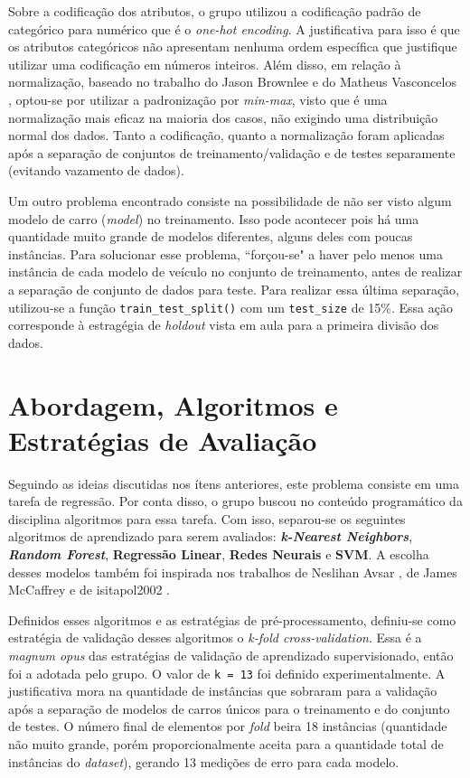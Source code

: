 \documentclass{report}
\let\oldsection\section
\renewcommand\section{\clearpage\oldsection}
\begin{document}
Sobre a codificação dos atributos, o grupo utilizou a codificação padrão de categórico para numérico que é o \textit{one-hot encoding}. A justificativa para isso é que os atributos categóricos não
apresentam nenhuma ordem específica que justifique utilizar uma codificação em números inteiros. Além disso, em relação à normalização, baseado no trabalho do Jason Brownlee \cite{ColumnTransformer} e
do Matheus Vasconcelos \cite{PadronizarDados}, optou-se por utilizar a padronização por \textit{min-max}, visto que é uma normalização mais eficaz na maioria dos casos, não exigindo uma distribuição normal
dos dados. Tanto a codificação, quanto a normalização foram aplicadas após a separação de conjuntos de treinamento/validação e de testes separamente (evitando vazamento de dados).

Um outro problema encontrado consiste na possibilidade de não ser visto algum modelo de carro (\textit{model}) no treinamento. Isso pode acontecer pois há uma quantidade muito grande de modelos diferentes,
alguns deles com poucas instâncias. Para solucionar esse problema, ``forçou-se" a haver pelo menos uma instância de cada modelo de veículo no conjunto de treinamento, antes de realizar a separação de
conjunto de dados para teste. Para realizar essa última separação, utilizou-se a função \texttt{train\_test\_split()} com um \texttt{test\_size} de 15\%. Essa ação corresponde à estragégia de \textit{holdout}
vista em aula para a primeira divisão dos dados.

\section{Abordagem, Algoritmos e Estratégias de Avaliação}

Seguindo as ideias discutidas nos ítens anteriores, este problema consiste em uma tarefa de regressão. Por conta disso, o grupo buscou no conteúdo programático da disciplina algoritmos para essa tarefa.
Com isso, separou-se os seguintes algoritmos de aprendizado para serem avaliados: \textbf{\textit{k-Nearest Neighbors}}, \textbf{\textit{Random Forest}}, \textbf{Regressão Linear}, \textbf{Redes Neurais}
e \textbf{SVM}. A escolha desses modelos também foi inspirada nos trabalhos de Neslihan Avsar \cite{LinearRegression}, de James McCaffrey \cite{Regression} e de isitapol2002 \cite{MultRegression}.

Definidos esses algoritmos e as estratégias de pré-processamento, definiu-se como estratégia de validação desses algoritmos o \textit{k-fold cross-validation}. Essa é a \textit{magnum opus} das estratégias
de validação de aprendizado supervisionado, então foi a adotada pelo grupo. O valor de \texttt{k = 13} foi definido experimentalmente. A justificativa mora na quantidade de instâncias que
sobraram para a validação após a separação de modelos de carros únicos para o treinamento e do conjunto de testes. O número final de elementos por \textit{fold} beira 18 instâncias (quantidade não muito grande,
porém proporcionalmente aceita para a quantidade total de instâncias do \textit{dataset}), gerando 13 medições de erro para cada modelo.
\end{document}
